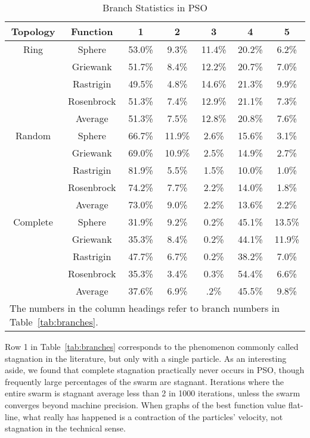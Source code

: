 \documentclass[journal,letterpaper]{IEEEtran}
\begin{document}
\begin{table}[h]
  \caption{Branch Statistics in PSO}
  \label{tab:stats}
  \centering
  \begin{tabular}{c|c|c|c|c|c|c}
	Topology&Function&1&2&3&4&5\\
	\hline
	\hline
	Ring&Sphere&53.0\%&9.3\%&11.4\%&20.2\%&6.2\%\\
	&Griewank&51.7\%&8.4\%&12.2\%&20.7\%&7.0\%\\
	&Rastrigin&49.5\%&4.8\%&14.6\%&21.3\%&9.9\%\\
	&Rosenbrock&51.3\%&7.4\%&12.9\%&21.1\%&7.3\%\\
	\cline{2-7}
	&Average&{51.3\%}&{7.5\%}&{12.8\%}&{20.8\%}&
	{7.6\%}\\
	\hline
	\hline
	Random&Sphere&66.7\%&11.9\%&2.6\%&15.6\%&3.1\%\\
	&Griewank&69.0\%&10.9\%&2.5\%&14.9\%&2.7\%\\
	&Rastrigin&81.9\%&5.5\%&1.5\%&10.0\%&1.0\%\\
	&Rosenbrock&74.2\%&7.7\%&2.2\%&14.0\%&1.8\%\\
	\cline{2-7}
	&Average&{73.0\%}&{9.0\%}&{2.2\%}&{13.6\%}&
	{2.2\%}\\
	\hline
	\hline
	Complete&Sphere&31.9\%&9.2\%&0.2\%&45.1\%&13.5\%\\
	&Griewank&35.3\%&8.4\%&0.2\%&44.1\%&11.9\%\\
	&Rastrigin&47.7\%&6.7\%&0.2\%&38.2\%&7.0\%\\
	&Rosenbrock&35.3\%&3.4\%&0.3\%&54.4\%&6.6\%\\
	\cline{2-7}
	&Average&{37.6\%}&{6.9\%}&{.2\%}&{45.5\%}&
	{9.8\%}\\
	\hline
	\multicolumn{7}{l}{The numbers in the column headings refer to branch
	numbers in Table~\ref{tab:branches}.}
  \end{tabular}
\end{table}

Row 1 in Table~\ref{tab:branches} corresponds to the phenomenon commonly called
stagnation in the literature, but only with a single particle.  As an
interesting aside, we found that complete stagnation practically never occurs
in PSO, though frequently large percentages of the swarm are stagnant.
Iterations where the entire swarm is stagnant average less than 2 in 1000
iterations, unless the swarm converges beyond machine precision.  When graphs
of the best function value flat-line, what really has happened is a contraction
of the particles' velocity, not stagnation in the technical sense.  
\end{document}

